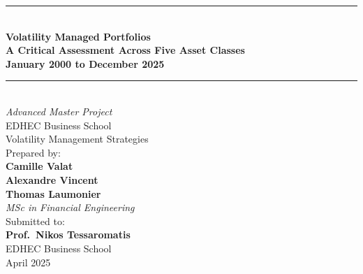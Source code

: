 \documentclass[12pt, a4paper]{article}
\begin{document}
\begin{titlepage}
\centering
\vspace*{2cm}
{\color{edhec}\rule{\linewidth}{1.5pt}}\\[0.4cm]
{\LARGE\bfseries\color{edhec} Volatility Managed Portfolios\\[0.3cm]
\large A Critical Assessment Across Five Asset Classes\\[0.2cm]
\normalsize January 2000 to December 2025}\\[0.4cm]
{\color{edhec}\rule{\linewidth}{1.5pt}}\\[1.5cm]
{\large\textit{Advanced Master Project}}\\[0.3cm]
{\large EDHEC Business School}\\[0.3cm]
{\large Volatility Management Strategies}\\[1.2cm]

{\normalsize Prepared by:}\\[0.3cm]
{\large \textbf{Camille Valat}}\\[0.1cm]
{\large \textbf{Alexandre Vincent}}\\[0.1cm]
{\large \textbf{Thomas Laumonier}}\\[0.4cm]
{\normalsize \textit{MSc in Financial Engineering}}\\[1.2cm]

{\normalsize Submitted to:}\\[0.2cm]
{\large\bfseries Prof.\ Nikos Tessaromatis}\\[0.2cm]
{\normalsize EDHEC Business School}\\[2cm]
{\normalsize April 2025}
\vfill
\end{titlepage}
\end{document}
